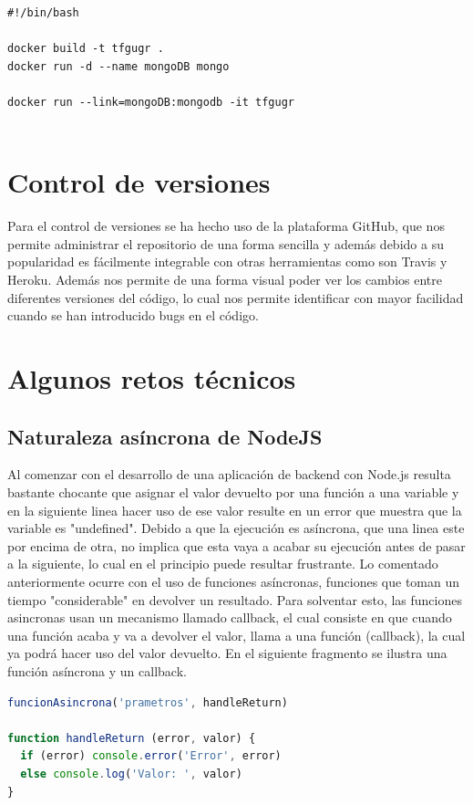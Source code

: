 \begin{lstlisting}
#!/bin/bash

docker build -t tfgugr .
docker run -d --name mongoDB mongo

docker run --link=mongoDB:mongodb -it tfgugr


\end{lstlisting}


\section {Control de versiones}
Para el control de versiones se ha hecho uso de la plataforma GitHub, que nos permite administrar el repositorio de una forma sencilla y además debido a su popularidad es fácilmente integrable con otras herramientas como son Travis y Heroku. Además nos permite de una forma visual poder ver los cambios entre diferentes versiones del código, lo cual nos permite identificar con mayor facilidad cuando se han introducido bugs en el código.


\section {Algunos retos técnicos}
\subsection {Naturaleza asíncrona de NodeJS}
Al comenzar con el desarrollo de una aplicación de backend con Node.js resulta bastante chocante que asignar el valor devuelto por una función a una variable y en la siguiente linea hacer uso de ese valor resulte en un error que muestra que la variable es "undefined". Debido a que la ejecución es asíncrona, que una linea este por encima de otra, no implica que esta vaya a acabar su ejecución antes de pasar a la siguiente, lo cual en el principio puede resultar frustrante. Lo comentado anteriormente ocurre con el uso de funciones asíncronas, funciones que toman un tiempo "considerable" en devolver un resultado. Para solventar esto, las funciones asincronas usan un mecanismo llamado callback, el cual consiste en que cuando una función acaba y va a devolver el valor, llama a una función (callback), la cual ya podrá hacer uso del valor devuelto. En el siguiente fragmento se ilustra una función asíncrona y un callback.

\begin{lstlisting}[language=javascript,caption={Ejemplo Callback},label={lst:appjs}]
funcionAsincrona('prametros', handleReturn)

function handleReturn (error, valor) {
  if (error) console.error('Error', error)
  else console.log('Valor: ', valor)
}
\end{lstlisting}

